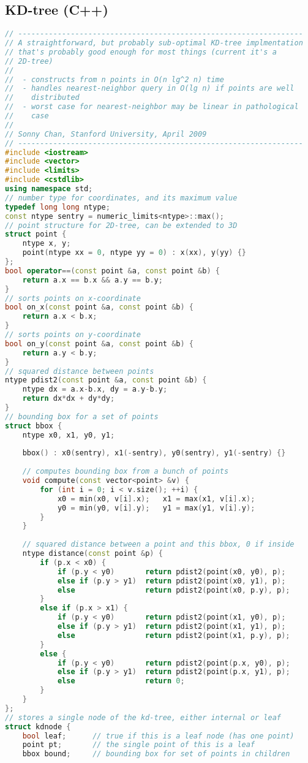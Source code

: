 \subsection{KD-tree (C++)}
\begin{lstlisting}[language=C++]
// -----------------------------------------------------------------
// A straightforward, but probably sub-optimal KD-tree implmentation
// that's probably good enough for most things (current it's a
// 2D-tree)
//
//  - constructs from n points in O(n lg^2 n) time
//  - handles nearest-neighbor query in O(lg n) if points are well
//    distributed
//  - worst case for nearest-neighbor may be linear in pathological
//    case
//
// Sonny Chan, Stanford University, April 2009
// -----------------------------------------------------------------
#include <iostream>
#include <vector>
#include <limits>
#include <cstdlib>
using namespace std;
// number type for coordinates, and its maximum value
typedef long long ntype;
const ntype sentry = numeric_limits<ntype>::max();
// point structure for 2D-tree, can be extended to 3D
struct point {
    ntype x, y;
    point(ntype xx = 0, ntype yy = 0) : x(xx), y(yy) {}
};
bool operator==(const point &a, const point &b) {
    return a.x == b.x && a.y == b.y;
}
// sorts points on x-coordinate
bool on_x(const point &a, const point &b) {
    return a.x < b.x;
}
// sorts points on y-coordinate
bool on_y(const point &a, const point &b) {
    return a.y < b.y;
}
// squared distance between points
ntype pdist2(const point &a, const point &b) {
    ntype dx = a.x-b.x, dy = a.y-b.y;
    return dx*dx + dy*dy;
}
// bounding box for a set of points
struct bbox {
    ntype x0, x1, y0, y1;
    
    bbox() : x0(sentry), x1(-sentry), y0(sentry), y1(-sentry) {}
    
    // computes bounding box from a bunch of points
    void compute(const vector<point> &v) {
        for (int i = 0; i < v.size(); ++i) {
            x0 = min(x0, v[i].x);   x1 = max(x1, v[i].x);
            y0 = min(y0, v[i].y);   y1 = max(y1, v[i].y);
        }
    }
    
    // squared distance between a point and this bbox, 0 if inside
    ntype distance(const point &p) {
        if (p.x < x0) {
            if (p.y < y0)       return pdist2(point(x0, y0), p);
            else if (p.y > y1)  return pdist2(point(x0, y1), p);
            else                return pdist2(point(x0, p.y), p);
        }
        else if (p.x > x1) {
            if (p.y < y0)       return pdist2(point(x1, y0), p);
            else if (p.y > y1)  return pdist2(point(x1, y1), p);
            else                return pdist2(point(x1, p.y), p);
        }
        else {
            if (p.y < y0)       return pdist2(point(p.x, y0), p);
            else if (p.y > y1)  return pdist2(point(p.x, y1), p);
            else                return 0;
        }
    }
};
// stores a single node of the kd-tree, either internal or leaf
struct kdnode {
    bool leaf;      // true if this is a leaf node (has one point)
    point pt;       // the single point of this is a leaf
    bbox bound;     // bounding box for set of points in children
    

\end{lstlisting}
